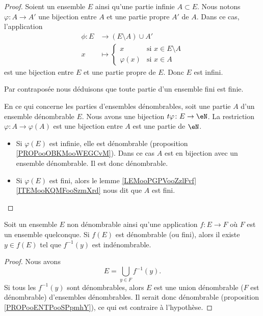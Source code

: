 \begin{proof}
	Soient un ensemble \( E\) ainsi qu'une partie infinie \( A\subset E\). Nous notons \( \varphi\colon A\to A'\) une bijection entre \( A\) et une partie propre \( A'\) de \( A\). Dans ce cas, l'application
	\begin{equation}
		\begin{aligned}
			\phi\colon E & \to (E\setminus A)\cup A'                         \\
			x            & \mapsto \begin{cases}
				                       x          & \text{si } x\in E\setminus A \\
				                       \varphi(x) & \text{si }x\in A
			                       \end{cases}
		\end{aligned}
	\end{equation}
	est une bijection entre \( E\) et une partie propre de \( E\). Donc \( E\) est infini.

	Par contraposée nous déduisons que toute partie d'un ensemble fini est finie.

	En ce qui concerne les parties d'ensembles dénombrables, soit une partie \( A\) d'un ensemble dénombrable \( E\). Nous avons une bijection \( t\varphi\colon E\to \eN\). La restriction \( \varphi\colon A\to \varphi(A)\) est une bijection entre \( A\) est une partie de \( \eN\).

	\begin{itemize}
		\item Si \( \varphi(E)\) est infinie, elle est dénombrable (proposition \ref{PROPooOBKMooWEGCvM}). Dans ce cas \( A\) est en bijection avec un ensemble dénombrable. Il est donc dénombrable.
		\item
		      Si \( \varphi(E)\) est fini, alors le lemme \ref{LEMooPGPVooZzlFvf}\ref{ITEMooKQMFooSzmXrd} nous dit que \( A\) est fini.
	\end{itemize}
\end{proof}

\begin{lemma}   \label{LEMooGTOTooFbpvzU}
	Soit un ensemble \( E\) non dénombrable ainsi qu'une application \( f\colon E\to F\) où \( F\) est un ensemble quelconque. Si \( f(E)\) est dénombrable (ou fini), alors il existe \( y\in f(E)\) tel que \( f^{-1}(y)\) est indénombrable.
\end{lemma}

\begin{proof}
	Nous avons
	\begin{equation}
		E=\bigcup_{y\in F}f^{-1}(y).
	\end{equation}
	Si tous les \( f^{-1}(y)\) sont dénombrables, alors \( E\) est une union dénombrable (\( F\) est dénombrable) d'ensembles dénombrables. Il serait donc dénombrable (proposition \ref{PROPooENTPooSPpmhY}), ce qui est contraire à l'hypothèse.
\end{proof}


